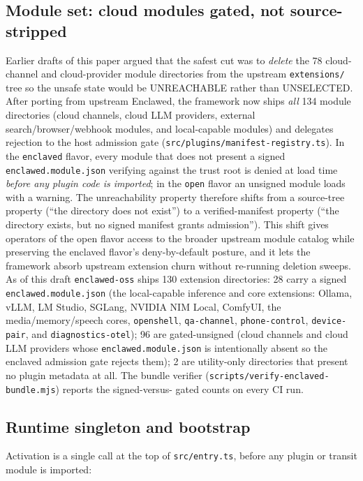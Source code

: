 \documentclass[11pt]{article}
\begin{document}
\subsection{Module set: cloud modules gated, not source-stripped}
\label{sec:moduleset}

Earlier drafts of this paper argued that the safest cut was to
\emph{delete} the 78 cloud-channel and cloud-provider module
directories from the upstream \texttt{extensions/} tree so the unsafe
state would be UNREACHABLE rather than UNSELECTED. After porting from
upstream Enclawed, the framework now ships \emph{all} 134 module
directories (cloud channels, cloud LLM providers, external
search/browser/webhook modules, and local-capable modules) and
delegates rejection to the host admission gate
(\texttt{src/plugins/manifest-registry.ts}). In the \texttt{enclaved}
flavor, every module that does not present a signed
\texttt{enclawed.module.json} verifying against the trust root is
denied at load time \emph{before any plugin code is imported}; in the
\texttt{open} flavor an unsigned module loads with a warning. The
unreachability property therefore shifts from a source-tree property
(``the directory does not exist'') to a verified-manifest property
(``the directory exists, but no signed manifest grants admission'').
This shift gives operators of the open flavor access to the broader
upstream module catalog while preserving the enclaved flavor's
deny-by-default posture, and it lets the framework absorb upstream
extension churn without re-running deletion sweeps. As of this draft
\texttt{enclawed-oss} ships 130 extension directories: 28 carry a
signed \texttt{enclawed.module.json} (the local-capable inference and
core extensions: Ollama, vLLM, LM Studio, SGLang, NVIDIA NIM Local,
ComfyUI, the media/memory/speech cores, \texttt{openshell},
\texttt{qa-channel}, \texttt{phone-control}, \texttt{device-pair}, and
\texttt{diagnostics-otel}); 96 are gated-unsigned (cloud channels and
cloud LLM providers whose \texttt{enclawed.module.json} is intentionally
absent so the enclaved admission gate rejects them); 2 are utility-only
directories that present no plugin metadata at all. The bundle verifier
(\texttt{scripts/verify-enclaved-bundle.mjs}) reports the signed-versus-
gated counts on every CI run.

\subsection{Runtime singleton and bootstrap}

Activation is a single call at the top of \texttt{src/entry.ts}, before
any plugin or transit module is imported:
\end{document}
